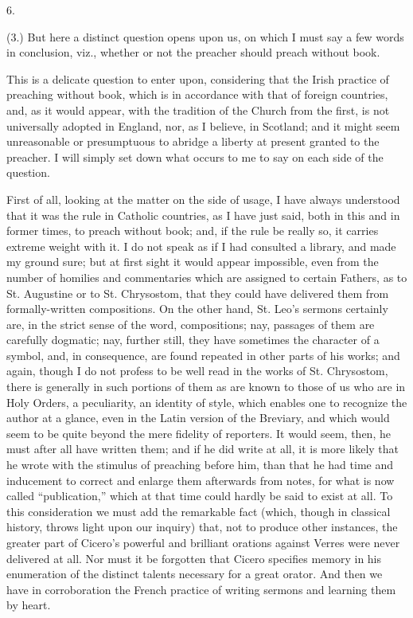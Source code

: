 6.

(3.) But here a distinct question opens upon us, on which I must
say a few words in conclusion, viz., whether or not the preacher
should preach without book.

This is a delicate question to enter upon, considering that the
Irish practice of preaching without book, which is in accordance with
that of foreign countries, and, as it would appear, with the tradition
of the Church from the first, is not universally adopted in England,
nor, as I believe, in Scotland; and it might seem unreasonable or
presumptuous to abridge a liberty at present granted to the preacher.
I will simply set down what occurs to me to say on each side of the
question.

First of all, looking at the matter on the side of usage, I have
always understood that it was the rule in Catholic countries, as I
have just said, both in this and in former times, to preach without
book; and, if the rule be really so, it carries extreme weight with
it. I do not speak as if I had consulted a library, and made my ground
sure; but at first sight it would appear impossible, even from the
number of homilies and commentaries which are assigned to certain
Fathers, as to St. Augustine or to St. Chrysostom, that they could
have delivered them from formally-written compositions. On the other
hand, St. Leo's sermons certainly are, in the strict sense of the
word, compositions; nay, passages of them are carefully dogmatic; nay,
further still, they have sometimes the character of a symbol, and, in
consequence, are found repeated in other parts of his works; and
again, though I do not profess to be well read in the works of
St. Chrysostom, there is generally in such portions of them as are
known to those of us who are in Holy Orders, a peculiarity, an
identity of style, which enables one to recognize the author at a
glance, even in the Latin version of the Breviary, and which would
seem to be quite beyond the mere fidelity of reporters. It would seem,
then, he must after all have written them; and if he did write at all,
it is more likely that he wrote with the stimulus of preaching before
him, than that he had time and inducement to correct and enlarge them
afterwards from notes, for what is now called ``publication,''
which at that time could hardly be said to exist at all. To this
consideration we must add the remarkable fact (which, though in
classical history, throws light upon our inquiry) that, not to produce
other instances, the greater part of Cicero's powerful and brilliant
orations against Verres were never delivered at all. Nor must it be
forgotten that Cicero specifies memory in his enumeration of the
distinct talents necessary for a great orator. And then we have in
corroboration the French practice of writing sermons and learning them
by heart.

